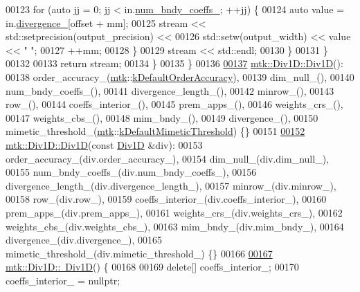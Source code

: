 \begin{DoxyCode}
00123       \textcolor{keywordflow}{for} (\textcolor{keyword}{auto} jj = 0; jj < in.\hyperlink{classmtk_1_1Div1D_a717240b41eaa2adde858630b9e3d3042}{num\_bndy\_coeffs\_}; ++jj) \{
00124         \textcolor{keyword}{auto} value = in.\hyperlink{classmtk_1_1Div1D_a0f96410051ba1fa6d91dfa7b7eacead9}{divergence\_}[offset + mm];
00125         stream << std::setprecision(output\_precision) <<
00126         std::setw(output\_width) << value << \textcolor{stringliteral}{" "};
00127         ++mm;
00128       \}
00129       stream << std::endl;
00130     \}
00131   \}
00132 
00133   \textcolor{keywordflow}{return} stream;
00134 \}
00135 \}
00136 
\hypertarget{mtk__div__1d_8cc_source_l00137}{}\hyperlink{classmtk_1_1Div1D_a339c66dd4ed8f50cbeda3645de18e5ab}{00137} \hyperlink{classmtk_1_1Div1D_a339c66dd4ed8f50cbeda3645de18e5ab}{mtk::Div1D::Div1D}():
00138   order\_accuracy\_(\hyperlink{namespacemtk}{mtk}::\hyperlink{group__c01-roots_ga0d95560098eb36420511103637b6952f}{kDefaultOrderAccuracy}),
00139   dim\_null\_(),
00140   num\_bndy\_coeffs\_(),
00141   divergence\_length\_(),
00142   minrow\_(),
00143   row\_(),
00144   coeffs\_interior\_(),
00145   prem\_apps\_(),
00146   weights\_crs\_(),
00147   weights\_cbs\_(),
00148   mim\_bndy\_(),
00149   divergence\_(),
00150   mimetic\_threshold\_(\hyperlink{namespacemtk}{mtk}::\hyperlink{group__c01-roots_ga35718d949bdc81a08a9cc8ebbe3478a2}{kDefaultMimeticThreshold}) \{\}
00151 
\hypertarget{mtk__div__1d_8cc_source_l00152}{}\hyperlink{classmtk_1_1Div1D_a25376152cf97aa27f6b61bcb62b4ea7a}{00152} \hyperlink{classmtk_1_1Div1D_a339c66dd4ed8f50cbeda3645de18e5ab}{mtk::Div1D::Div1D}(\textcolor{keyword}{const} \hyperlink{classmtk_1_1Div1D}{Div1D} &div):
00153   order\_accuracy\_(div.order\_accuracy\_),
00154   dim\_null\_(div.dim\_null\_),
00155   num\_bndy\_coeffs\_(div.num\_bndy\_coeffs\_),
00156   divergence\_length\_(div.divergence\_length\_),
00157   minrow\_(div.minrow\_),
00158   row\_(div.row\_),
00159   coeffs\_interior\_(div.coeffs\_interior\_),
00160   prem\_apps\_(div.prem\_apps\_),
00161   weights\_crs\_(div.weights\_crs\_),
00162   weights\_cbs\_(div.weights\_cbs\_),
00163   mim\_bndy\_(div.mim\_bndy\_),
00164   divergence\_(div.divergence\_),
00165   mimetic\_threshold\_(div.mimetic\_threshold\_) \{\}
00166 
\hypertarget{mtk__div__1d_8cc_source_l00167}{}\hyperlink{classmtk_1_1Div1D_ac2c215f42b8da513df2a4ee477b5fa1f}{00167} \hyperlink{classmtk_1_1Div1D_ac2c215f42b8da513df2a4ee477b5fa1f}{mtk::Div1D::~Div1D}() \{
00168 
00169   \textcolor{keyword}{delete}[] coeffs\_interior\_;
00170   coeffs\_interior\_ = \textcolor{keyword}{nullptr};

\end{DoxyCode}
